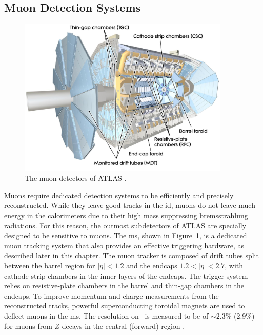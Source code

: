 \subsection{Muon Detection Systems}
\begin{figure}[!h]
  \centering
  \includegraphics[width=0.9\textwidth]{Images/ATLAS/ATLASMuon.jpg}
  \caption{The muon detectors of ATLAS \cite{ATLASschematics}.}
  \label{fig-AtlasDecMuon}
\end{figure}
Muons require dedicated detection systems to be efficiently and precisely reconstructed. While they leave good tracks in the \gls{id}, muons do not leave much energy in the calorimeters due to their high mass suppressing bremsstrahlung radiations. For this reason, the outmost subdetectors of ATLAS are specially designed to be sensitive to muons. The \gls{ms}, shown in Figure~\ref{fig-AtlasDecMuon}, is a dedicated muon tracking system that also provides an effective triggering hardware, as described later in this chapter. The muon tracker is composed of drift tubes split between the barrel region for $|\eta| < 1.2$ and the endcaps $1.2 < |\eta| < 2.7$, with cathode strip chambers in the inner layers of the endcaps. The trigger system relies on resistive-plate chambers in the barrel and thin-gap chambers in the endcaps. To improve momentum and charge measurements from the reconstructed tracks, powerful superconducting toroidal magnets are used to deflect muons in the \gls{ms}. The resolution on \pt\ is measured to be of $\sim 2.3$\% (2.9\%) for muons from $Z$ decays in the central (forward) region \cite{atlasMuonPTReco}.

